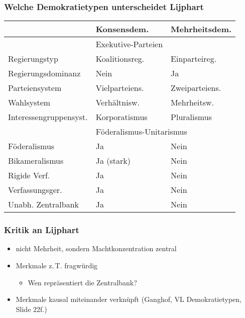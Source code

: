 \documentclass{beamer}
\begin{document}
\begin{frame}
\frametitle{Welche Demokratietypen unterscheidet Lijphart}
\begin{tabular}{lll}
~   & \textbf{Konsensdem.} & \textbf{Mehrheitsdem.} \\ \hline
~   & Exekutive-Parteien \\ \hline
Regierungstyp  & Koalitionsreg. & Einparteireg. \\
Regierungsdominanz  & Nein & Ja \\
Parteiensystem  & Vielparteiens. & Zweiparteiens. \\
Wahlsystem & Verhältnisw. & Mehrheitsw. \\
Interessengruppensyst.  & Korporatismus & Pluralismus \\ \hline
    & \multicolumn{2}{l}{Föderalismus-Unitarismus} \\ \hline
Föderalismus & Ja & Nein \\
Bikameralismus  & Ja (stark) & Nein \\
Rigide Verf.  & Ja & Nein \\
Verfassungsger.  & Ja & Nein \\
Unabh. Zentralbank & Ja & Nein \\
\end{tabular}
\end{frame}

\begin{frame}
\frametitle{Kritik an Lijphart}
\begin{itemize}
  \item nicht Mehrheit, sondern Machtkonzentration zentral
  \item Merkmale z.\,T. fragwürdig
  \begin{itemize}
    \item Wen repräsentiert die Zentralbank?
  \end{itemize}
  \item Merkmale kausal miteinander verknüpft\newline
    (Ganghof, VL Demokratietypen, Slide 22f.)
\end{itemize}
\begin{figure}
\centering
{}
\vfill
\begin{figure}
\centering
{}
\end{figure}
\end{figure}
\end{frame}
\end{document}
